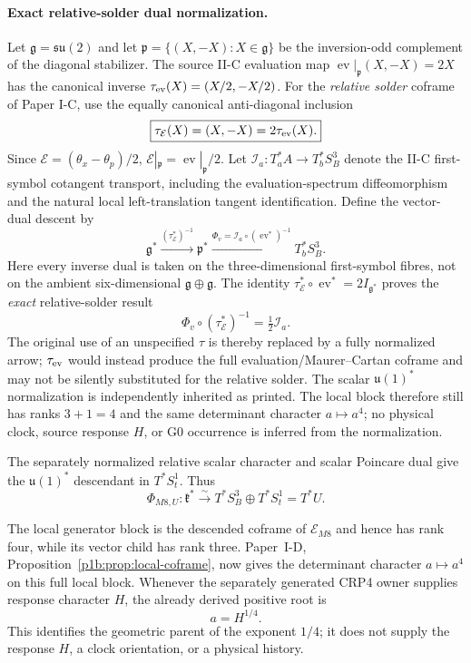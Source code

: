 \documentclass[12pt,a4paper]{article}
\begin{document}
\paragraph{Exact relative-solder dual normalization.}
Let $\mathfrak g=\mathfrak{su}(2)$ and let
$\mathfrak p=\{(X,-X):X\in\mathfrak g\}$ be the inversion-odd
complement of the diagonal stabilizer. The source II-C evaluation map
$\operatorname{ev}|_{\mathfrak p}(X,-X)=2X$ has the canonical inverse
$\tau_{\rm ev}(X)=(X/2,-X/2)$. For the \emph{relative solder}
coframe of Paper I-C, use the equally canonical anti-diagonal
inclusion
\[
 \boxed{\tau_{\mathcal E}(X)=(X,-X)=2\tau_{\rm ev}(X).}
\]
Since $\mathcal E=(\theta_x-\theta_p)/2$,
$\mathcal E|_{\mathfrak p}=\operatorname{ev}|_{\mathfrak p}/2$.
Let $\mathcal I_a:T_a^*A\to T_b^*S_B^3$ denote the II-C
first-symbol cotangent transport, including the evaluation-spectrum
diffeomorphism and the natural local left-translation tangent
identification. Define the vector-dual descent by
\[
 \boxed{\mathfrak g^*
 \xrightarrow{(\tau_{\mathcal E}^*)^{-1}}\mathfrak p^*
 \xrightarrow{\Phi_v=\mathcal I_a\circ(\operatorname{ev}^*)^{-1}}
 T_b^*S_B^3.}
\]
Here every inverse dual is taken on the three-dimensional first-symbol
fibres, not on the ambient six-dimensional $\mathfrak g\oplus\mathfrak g$.
The identity
$\tau_{\mathcal E}^*\circ\operatorname{ev}^*=2I_{\mathfrak g^*}$
proves the \emph{exact} relative-solder result
\[
 \boxed{\Phi_v\circ(\tau_{\mathcal E}^*)^{-1}
 =\tfrac12\mathcal I_a.}
\]
The original use of an unspecified $\tau$ is thereby replaced by
a fully normalized arrow; $\tau_{\rm ev}$ would instead produce
the full evaluation/Maurer--Cartan coframe and may not be silently
substituted for the relative solder. The scalar $\mathfrak u(1)^*$
normalization is independently inherited as printed. The local block
therefore still has ranks $3+1=4$ and the same determinant character
$a\mapsto a^4$; no physical clock, source response $H$, or G0
occurrence is inferred from the normalization.

The separately normalized relative scalar character and scalar Poincare dual
give the $\mathfrak u(1)^*$ descendant in $T^*S_t^1$.  Thus
\[
 \boxed{\Phi_{M8,U}:\mathfrak k^*
 \xrightarrow{\sim}T^*S_B^3\oplus T^*S_t^1=T^*U.}
\]

\begin{corollary}
\label{p3a:cor:v187-rank-four-parent-root}
The local generator block is the descended coframe of
$\mathcal E_{M8}$ and hence has rank four, while its vector child has rank
three. Paper~I-D, Proposition~\ref{p1b:prop:local-coframe}, now gives
the determinant character $a\mapsto a^4$ on this full local block.  Whenever the separately generated CRP4
owner supplies response character $H$, the already derived positive root is
\[
 a=H^{1/4}.
\]
This identifies the geometric parent of the exponent $1/4$; it does not
supply the response $H$, a clock orientation, or a physical history.
\end{corollary}
\end{document}
